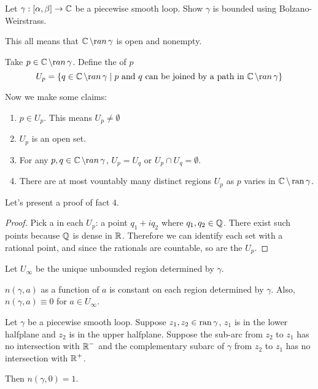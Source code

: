\documentclass[notes]{subfile}
\begin{document}
\begin{exercise}
    Let $\gamma : [\alpha, \beta] \to \operatorname{\mathbb{C}}$ be a piecewise smooth loop.  Show $\gamma$ is bounded using Bolzano-Weirstrass.
\end{exercise}

\smallbreak
This all means that $\operatorname{\mathbb{C}} \setminus {\text ran} \, \gamma$ is open and nonempty.

\begin{definition}
    Take $p \in \operatorname{\mathbb{C}} \setminus {\text ran} \, \gamma$.
    Define the  of $p$
    \[ U_p = \{ q \in \operatorname{\mathbb{C}} \setminus {\text ran} \, \gamma \; | \; 
    \text{$p$ and $q$ can be joined by a path in $\operatorname{\mathbb{C}} \setminus {\text ran} \, \gamma$} \} \]
\end{definition}
Now we make some claims:

\begin{enumerate}
    \item $p \in  U_p$.  This means $U_p \ne \emptyset$

    \item $U_p$ is an open set.

    \item For any $p,q \in \operatorname{\mathbb{C}} \setminus {\text ran} \, \gamma$, $U_p = U_q$ or $U_p \cap U_q = \emptyset$.

    \item There are at most vountably many distinct regions $U_p$ as $p$ varies in $\operatorname{\mathbb{C}} \setminus \operatorname{ran}{\gamma}$.
\end{enumerate}

Let's present a proof of fact $4$.

\begin{proof}
    Pick a  in each $U_p$: a point $q_1 + iq_2$ where $q_1, q_2 \in \operatorname{\mathbb{Q}}$.
    There exist such points because $\operatorname{\mathbb{Q}}$ is dense in $\operatorname{\mathbb{R}}$.
    Therefore we can identify each set with a rational point, and since the rationals are countable, so are the $U_p$.
\end{proof}

Let $U_{\infty}$ be the unique unbounded region determined by $\gamma$.

\begin{theorem}
    $n(\gamma, a)$ as a function of $a$ is constant on each region determined by $\gamma$.
    Also, $n(\gamma, a) \equiv 0$ for $a \in U_{\infty}$. 
\end{theorem}

\begin{theorem}
    Let $\gamma$ be a piecewise smooth loop.
    Suppose $z_1, z_2 \in \operatorname{ran}{\gamma}$, $z_1$ is in the lower halfplane and $z_2$ is in the upper halfplane.
    Suppose the sub-arc from $z_2$ to $z_1$ has no intersection with $\operatorname{\mathbb{R}}^-$ and the complementary subarc of $\gamma$ from $z_2$ to $z_1$ has no intersection with $\operatorname{\mathbb{R}}^+$.

    \noindent
    Then $n(\gamma, 0) = 1$.
\end{theorem}
\end{document}

